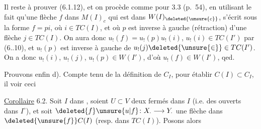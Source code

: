 Il reste à prouver (6.1.12), et on procède
comme pour 3.3 (p.~54), en utilisant
le fait qu'une flèche $f$ dans $M(I)_c$
qui est dans $W(I)_{\deleted{\unsure{c}}}$, s'écrit  sous la
forme $f=pi$, où $i\in TC(I)$, et
où $p$ est  inverse à gauche (rétraction)
d'une flèche $j\in TC(I)$. On aura
donc $u_!(f)=u_!(p)u_!(i)$,  $u_!(i)\in TC(I')$
par (6..10), et $u_!(p)$ est inverse à
gauche de $u_!(j)\deleted{\unsure{\in}} \in TC(I')$. On a
donc $u_!(i)$, $u_!(j)$, $u_!(p)\in W(I')$, d'où
$u_!(f)\in W(I')$, qed.

Prouvons enfin d).  Compte
tenu de la définition de $C_I$, pour
établir $C(I)\subset C_I$, il  
voir ceci

\uline{Corollaire} 6.2. Soit $I$  dans ,
soient $U\subset V$ deux fermés dans $I$
(i.e. des ouverts dans $I^\circ$), et 
soit $\deleted{f}\unsure{u|f}\colon X_\cdot\longrightarrow Y_\cdot$ une flèche
dans $\deleted{\unsure{f}}C(I)$ (resp. dans $TC(I)$).
 Posons alors

